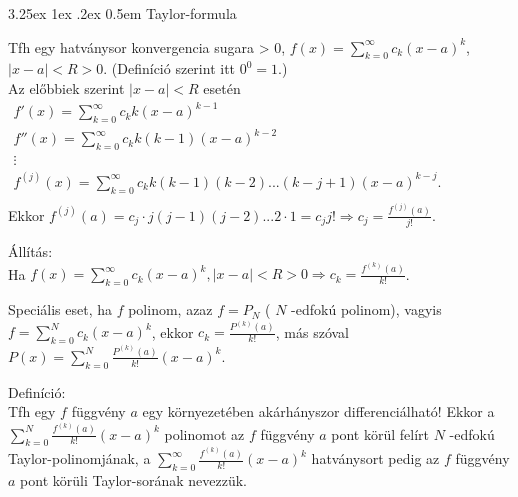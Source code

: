 \documentclass[12pt,a4paper]{scrartcl}
\makeatletter
\renewcommand\paragraph{\@startsection{paragraph}{4}{\z@}%
                                    {3.25ex \@plus1ex \@minus.2ex}%
                                    {0.5em} %
                                    {\normalfont\normalsize\bfseries}}
\newenvironment{definicio}{}{}
\newenvironment{allitas}{}{}
\makeatother
\begin{document}
\hypertarget{taylor-formula}{%
\paragraph{Taylor-formula}\label{taylor-formula}}

Tfh egy hatványsor konvergencia sugara \textgreater{} 0,
\(f\left( x \right) = {\sum\limits_{k = 0}^{\infty}{c_{k}\left( {x - a} \right)^{k}}}\),
\(\left| {x - a} \right| < R > 0\). (Definíció szerint itt
\(0^{0} = 1\).)\\
Az előbbiek szerint \(\left| {x - a} \right| < R\) esetén\\
\(\begin{array}{l} {f'\left( x \right) = {\sum\limits_{k = 0}^{\infty}{c_{k}k\left( {x - a} \right)^{k - 1}}}} \\ {f''\left( x \right) = {\sum\limits_{k = 0}^{\infty}{c_{k}k\left( {k - 1} \right)\left( {x - a} \right)^{k - 2}}}} \\  \vdots \\ {f^{(j)}\left( x \right) = {\sum\limits_{k = 0}^{\infty}{c_{k}k\left( {k - 1} \right)\left( {k - 2} \right)...\left( {k - j + 1} \right)\left( {x - a} \right)^{k - j}.}}} \\ \end{array}\)\\
Ekkor
\(\left. f^{(j)}\left( a \right) = c_{j} \cdot j\left( {j - 1} \right)\left( {j - 2} \right)...2 \cdot 1 = c_{j}j!\Rightarrow c_{j} = \frac{f^{(j)}\left( a \right)}{j!} \right.\).

\begin{allitas}

Állítás:\\
Ha
\(f\left( x \right) = {\sum\limits_{k = 0}^{\infty}\left. c_{k}\left( {x - a} \right)^{k},\left| {x - a} \right| < R > 0\Rightarrow c_{k} = \frac{f^{(k)}\left( a \right)}{k!} \right.}\).

\end{allitas}

Speciális eset, ha \(f\) polinom, azaz \(f = P_{N}\) ( \(N\) -edfokú
polinom), vagyis
\(f = {\sum\limits_{k = 0}^{N}{c_{k}\left( {x - a} \right)^{k}}}\),
ekkor \(c_{k} = \frac{P^{(k)}\left( a \right)}{k!}\), más szóval
\(P\left( x \right) = {\sum\limits_{k = 0}^{N}{\frac{P^{(k)}\left( a \right)}{k!}\left( {x - a} \right)^{k}}}\).

\begin{definicio}

Definíció:\\
Tfh egy \(f\) függvény \(a\) egy környezetében akárhányszor
differenciálható! Ekkor a
\({\sum\limits_{k = 0}^{N}\frac{f^{(k)}\left( a \right)}{k!}}\left( {x - a} \right)^{k}\)
polinomot az \(f\) függvény \(a\) pont körül felírt \(N\) -edfokú
Taylor-polinomjának, a
\(\sum\limits_{k = 0}^{\infty}{\frac{f^{(k)}\left( a \right)}{k!}\left( {x - a} \right)^{k}}\)
hatványsort pedig az \(f\) függvény \(a\) pont körüli Taylor-sorának
nevezzük.

\end{definicio}
\end{document}
